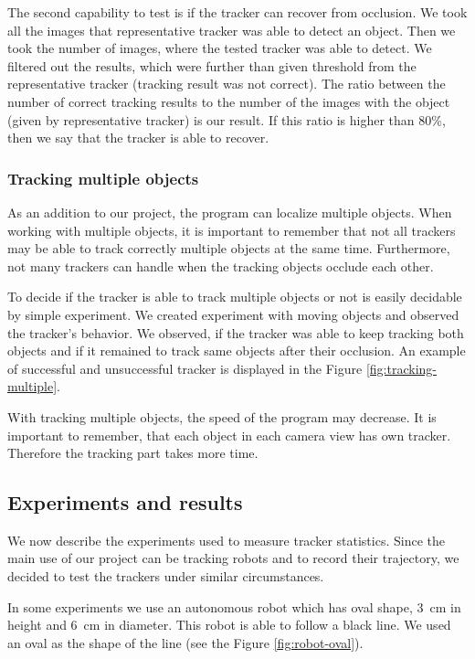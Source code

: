 The second capability to test is if the tracker can recover from occlusion.
We took all the images that representative tracker was able to detect an
object. Then we took the number of images, where the tested tracker was able to
detect. We filtered out the results, which were further than given threshold
from the representative tracker (tracking result was not correct). The ratio
between the number of correct tracking results to the number of the images with
the object (given by representative tracker) is our result. If this ratio is
higher than 80\%, then we say that the tracker is able to recover.

\subsubsection*{Tracking multiple objects}

As an addition to our project, the program can localize multiple objects. When
working with multiple objects, it is important to remember that not all
trackers may be able to track correctly multiple objects at the same time.
Furthermore, not many trackers can handle when the tracking objects occlude
each other.

To decide if the tracker is able to track multiple objects or not is easily
decidable by simple experiment. We created experiment with moving objects and
observed the tracker's behavior. We observed, if the tracker was able to keep
tracking both objects and if it remained to track same objects after their
occlusion. An example of successful and unsuccessful tracker is displayed in
the Figure \ref{fig:tracking-multiple}.

With tracking multiple objects, the speed of the program may decrease.
It is important to remember, that each object in each camera view has own
tracker. Therefore the tracking part takes more time.


\subsection{Experiments and results}

We now describe the experiments used to measure tracker statistics. Since the
main use of our project can be tracking robots and to record their trajectory,
we decided to test the trackers under similar circumstances.

In some experiments we use an autonomous robot which has oval shape, 3~cm
in height and 6~cm in diameter. This robot is able to follow a black line.
We used an oval as the shape of the line (see the Figure \ref{fig:robot-oval}).

